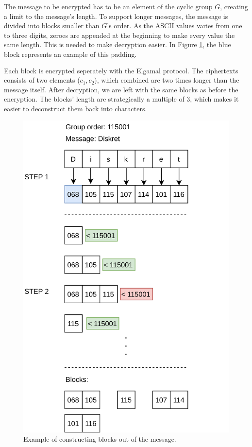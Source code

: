 \documentclass{article}
\begin{document}
The message to be encrypted has to be an element of the cyclic group $G$, creating a limit to the message's length. To support longer messages, the message is divided into blocks smaller than $G$'s order. As the ASCII values varies from one to three digits, zeroes are appended at the beginning to make every value the same length. This is needed to make decryption easier. In Figure \ref{blocks}, the blue block represents an example of this padding. 

Each block is encrypted seperately with the Elgamal protocol. The ciphertexts consists of two elements ($c_1, c_2$), which combined are two times longer than the message itself. After decryption, we are left with the same blocks as before the encryption. The blocks' length are strategically a multiple of 3, which makes it easier to deconstruct them back into characters.  

\begin{figure}
    \centering
    \includegraphics[scale=0.1]{img/construct-blocks.png}
    \caption{Example of constructing blocks out of the message.}
    \label{blocks}
\end{figure}
\end{document}
